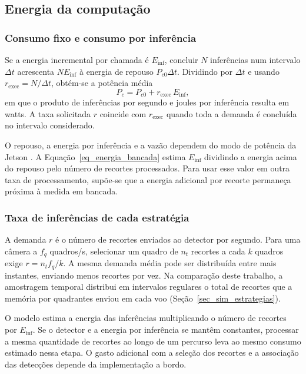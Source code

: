 \subsection{Energia da computação}

\subsubsection{Consumo fixo e consumo por inferência}

Se a energia incremental por chamada é $E_{\mathrm{inf}}$, concluir $N$ inferências num intervalo $\Delta t$ acrescenta $N E_{\mathrm{inf}}$ à energia de repouso $P_{c0}\Delta t$. Dividindo por $\Delta t$ e usando $r_{\mathrm{exec}}=N/\Delta t$, obtém-se a potência média
\begin{equation}
  P_c = P_{c0} + r_{\mathrm{exec}}\,E_{\mathrm{inf}},
  \label{eq_pc}
\end{equation}
em que o produto de inferências por segundo e joules por inferência resulta em watts. A taxa solicitada $r$ coincide com $r_{\mathrm{exec}}$ quando toda a demanda é concluída no intervalo considerado.

O repouso, a energia por inferência e a vazão dependem do modo de potência da Jetson \cite{nvidia2024orinnano,nvidia2025jetpack62}. A Equação~\eqref{eq_energia_bancada} estima $E_{\mathrm{inf}}$ dividindo a energia acima do repouso pelo número de recortes processados. Para usar esse valor em outra taxa de processamento, supõe-se que a energia adicional por recorte permaneça próxima à medida em bancada.

\subsubsection{Taxa de inferências de cada estratégia}

A demanda $r$ é o número de recortes enviados ao detector por segundo. Para uma câmera a $f_q$ quadros/s, selecionar um quadro de $n_t$ recortes a cada $k$ quadros exige $r=n_t f_q/k$. A mesma demanda média pode ser distribuída entre mais instantes, enviando menos recortes por vez. Na comparação deste trabalho, a amostragem temporal distribui em intervalos regulares o total de recortes que a memória por quadrantes enviou em cada voo (Seção~\ref{sec_sim_estrategias}).

O modelo estima a energia das inferências multiplicando o número de recortes por $E_{\mathrm{inf}}$. Se o detector e a energia por inferência se mantêm constantes, processar a mesma quantidade de recortes ao longo de um percurso leva ao mesmo consumo estimado nessa etapa. O gasto adicional com a seleção dos recortes e a associação das detecções depende da implementação a bordo.

